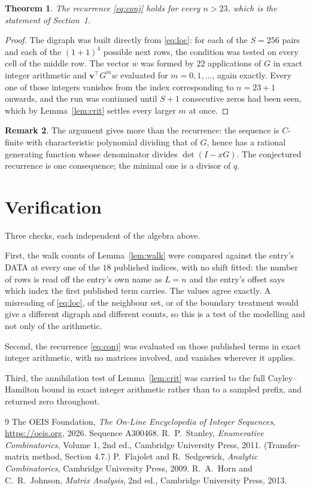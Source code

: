 \documentclass[11pt,a4paper]{article}
\theoremstyle{plain}
\newtheorem{theorem}{Theorem}
\theoremstyle{definition}
\newtheorem{remark}[theorem]{Remark}
\begin{document}
\begin{theorem}
The recurrence \eqref{eq:conj} holds for every $n>23$, which is the statement of
Section~1.
\end{theorem}

\begin{proof}
The digraph was built directly from \eqref{eq:loc}: for each of the $S=256$ pairs and each
of the $(1+1)^{4}$ possible next rows, the condition was tested on every cell of
the middle row. The vector $w$ was formed by $22$ applications of $G$ in exact integer
arithmetic and $\mathbf{v}^{\!\top}G^{m}w$ evaluated for $m=0,1,\dots$, again exactly.
Every one of those integers vanishes from the index corresponding to $n=23+1$ onwards,
and the run was continued until $S+1$ consecutive zeros had been seen, which by
Lemma~\ref{lem:crit} settles every larger $m$ at once.
\end{proof}

\begin{remark}
The argument gives more than the recurrence: the sequence is $C$-finite with characteristic
polynomial dividing that of $G$, hence has a rational generating function whose denominator
divides $\det(I-xG)$. The conjectured recurrence is one consequence; the minimal one is a
divisor of $q$.
\end{remark}

\section{Verification}

Three checks, each independent of the algebra above.

First, the walk counts of Lemma~\ref{lem:walk} were compared against the entry's DATA at
every one of the $18$ published indices, with no shift fitted: the number of rows is
read off the entry's own name as $L=n$ and the entry's offset says which index the first
published term carries. The values agree exactly. A misreading of \eqref{eq:loc}, of the
neighbour set, or of the boundary treatment would give a different digraph and different
counts, so this is a test of the modelling and not only of the arithmetic.

Second, the recurrence \eqref{eq:conj} was evaluated on those published terms in exact
integer arithmetic, with no matrices involved, and vanishes wherever it applies.

Third, the annihilation test of Lemma~\ref{lem:crit} was carried to the full
Cayley--Hamilton bound in exact integer arithmetic rather than to a sampled prefix, and
returned zero throughout.

\begin{thebibliography}{9}
 The OEIS Foundation, \emph{The On-Line Encyclopedia of Integer
Sequences}, \url{https://oeis.org}, 2026. Sequence A300468.
 R.~P.~Stanley, \emph{Enumerative Combinatorics}, Volume 1, 2nd ed.,
Cambridge University Press, 2011. (Transfer-matrix method, Section 4.7.)
 P.~Flajolet and R.~Sedgewick, \emph{Analytic Combinatorics}, Cambridge
University Press, 2009.
 R.~A.~Horn and C.~R.~Johnson, \emph{Matrix Analysis}, 2nd ed., Cambridge
University Press, 2013.
\end{thebibliography}
\end{document}

